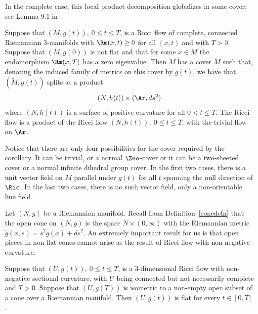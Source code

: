 In the complete case, this local product decomposition globalizes in
some cover; see Lemma 9.1 in \cite{Hamilton4MPCO}.


\begin{corollary}
\label{cor:global-product-splitting-cover}
\label{nullspace}
Suppose that $(M,g(t)),\ 0\le t\le T$, is a Ricci flow of complete, connected
Riemannian $3$-manifolds with $\Rm(x,t)\ge 0$ for all $(x,t)$ and with
$T>0$. Suppose that $(M,g(0))$ is not flat and that for some $x\in M$  the
endomorphism $\Rm(x,T)$ has a zero eigenvalue. Then $M$ has a cover
$\widetilde M$ such that, denoting the induced family of metrics on this cover
by $\tilde g(t)$, we have that $(\widetilde M,\tilde g(t))$ splits as a product
$$(N,h(t))\times (\Ar,ds^2)$$
where $(N,h(t))$ is a surface of positive curvature for all $0<t\le
T$. The Ricci flow is a product of the Ricci flow $(N,h(t)),\ 0\le
t\le T$, with the trivial flow on $\Ar$.
\end{corollary}


\begin{remark}
\label{rem:product-splitting-cover-classification}
Notice that there are only four possibilities for the cover required
by the corollary. It can be trivial, or a normal $\Zee$-cover or it
can be a two-sheeted cover or a normal infinite dihedral group
cover. In the first two cases, there is a unit vector field on $M$
parallel under $g(t)$ for all $t$ spanning the null direction of
$\Ric$. In the last two cases, there is no such vector field,
only a non-orientable line field.
\end{remark}


 Let $(N,g)$ be a Riemannian manifold. Recall from Definition~\ref{conedefn}
  that the open cone
on $(N,g)$ is the space $N\times (0,\infty)$ with the Riemannian
metric $\tilde g(x,s)=s^2g(x)+ds^2$. An extremely important result
for us is that open pieces in non-flat cones cannot arise as the
result of Ricci flow with non-negative curvature.



\begin{proposition}
\label{prop:no-nonflat-cones-from-ricci-flow}
\label{nocones}
Suppose that $(U,g(t)),\ 0\le t\le T$, is a $3$-dimensional Ricci
flow with non-negative sectional curvature, with $U$ being connected
but not necessarily complete and $T>0$. Suppose that $(U,g(T))$ is
isometric to a non-empty open subset of a cone over a Riemannian
manifold. Then $(U,g(t))$ is flat for every $t\in [0,T]$.
\end{proposition}



